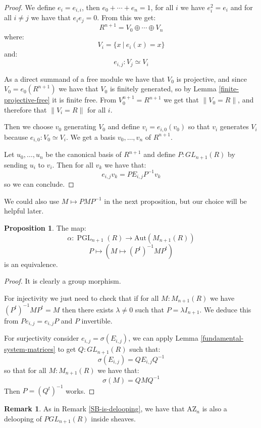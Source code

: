 \documentclass[10pt,a4paper]{article}
\theoremstyle{definition}
\newtheorem{remark}[theorem]{Remark}
\newtheorem{proposition}[theorem]{Proposition}
\DeclareMathOperator{\PGL}{PGL}
\newcommand{\AZ}{\mathrm{AZ}}
\newcommand{\propTrunc}[1]{\lVert #1 \rVert}
\newcommand{\Aut}{\mathrm{Aut}}
\begin{document}
\begin{proof}
We define $e_i = e_{i,i}$, then $e_0+\cdots+e_n = 1$, for all $i$ we have $e_i^2=e_i$ and for all $i\not=j$ we have that $e_ie_j=0$. From this we get:
\[R^{n+1} = V_0\oplus\cdots\oplus V_n\]
where:
\[V_i = \{x\ |\ e_i(x)=x\}\]
and:
\[e_{i,j}:V_j\simeq V_i\]

As a direct summand of a free module we have that $V_0$ is projective, and since $V_0 = e_{0}(R^{n+1})$ we have that $V_0$ is finitely generated, so by Lemma \ref{finite-projective-free} it is finite free. From $V_0^{n+1}=R^{n+1}$ we get that $\propTrunc{V_0=R}$, and therefore that $\propTrunc{V_i=R}$ for all $i$.

Then we choose $v_0$ generating $V_0$ and define $v_i = e_{i,0}(v_0)$ so that $v_i$ generates $V_i$ because $e_{i,0}:V_0\simeq V_i$. We get a basis $v_0,\hdots,v_n$ of $R^{n+1}$.

Let $u_0,\hdots,u_n$ be the canonical basis of $R^{n+1}$ and define $P:GL_{n+1}(R)$ by sending $u_i$ to $v_i$. Then for all $v_k$ we have that:
\[e_{i,j}v_k = PE_{i,j}P^{-1}v_k\]
so we can conclude.
\end{proof}

We could also use $M\mapsto PMP^{-1}$ in the next proposition, but our choice will be helpful later.

\begin{proposition}\label{Aut-MnR-PGL}
The map:
\[\alpha:\PGL_{n+1}(R)\to\Aut(M_{n+1}(R))\]
\[P\mapsto (M\mapsto (P^t)^{-1}MP^t)\]
is an equivalence.
\end{proposition}

\begin{proof}
It is clearly a group morphism. 

For injectivity we just need to check that if for all $M:M_{n+1}(R)$ we have $(P^t)^{-1}MP^t=M$ then there exists $\lambda\not=0$ such that $P=\lambda I_{n+1}$. We deduce this from $Pe_{i,j} = e_{i,j}P$ and $P$ invertible.

For surjectivity consider $e_{i,j}=\sigma(E_{i,j})$, we can apply Lemma \ref{fundamental-system-matrices} to get $Q:GL_{n+1}(R)$ such that:
\[\sigma(E_{i,j}) = QE_{i,j}Q^{-1}\]
so that for all $M:M_{n+1}(R)$ we have that:
\[\sigma(M) = QMQ^{-1}\]
Then $P = (Q^t)^{-1}$ works.
\end{proof}

\begin{remark}\label{AZ-is-delooping}
As in Remark \ref{SB-is-delooping}, we have that $\AZ_n$ is also a delooping of $PGL_{n+1}(R)$ inside sheaves.
\end{remark}
\end{document}
